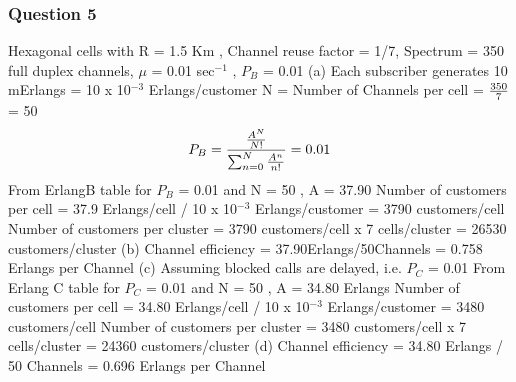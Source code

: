 \documentclass[12pt]{article}
\begin{document}
\subsubsection*{Question 5}
\vspace{5mm}
Hexagonal cells with R = 1.5 Km , 
Channel reuse factor = 1/7,
Spectrum = 350 full duplex channels,
\(\mu\) = 0.01 sec\(^{-1}\) , 
\(P_B\) = 0.01
\newline
\newline
(a) Each subscriber generates 10 mErlangs = 10 x 10\(^{-3}\) Erlangs/customer
\newline
\newline
N = Number of Channels per cell = \(350\over7\) = 50
\begin{equation*}
	P_B = { {{A^N}\over N!} \over {\sum_{n=0}^{N} { A^n \over n! } }  } = 0.01
\end{equation*}
From ErlangB table for \(P_B\) = 0.01 and N = 50 , A = 37.90
\newline
\newline
Number of customers per cell = {37.9 Erlangs/cell \bigg/ 10 x 10\(^{-3}\) Erlangs/customer}
= 3790 customers/cell
\newline
\newline
Number of customers per cluster = 3790 customers/cell x 7 cells/cluster 
= 26530 customers/cluster
\newline
\newline
(b) Channel efficiency 
\newline
= 37.90Erlangs/50Channels = 0.758 Erlangs per Channel
\newline
\newline
(c) Assuming blocked calls are delayed, i.e. \(P_C\) = 0.01
\newline
\newline
From Erlang C table for \(P_C\) = 0.01 and N = 50 , A = 34.80 Erlangs
\newline
Number of customers per cell = {34.80 Erlangs/cell \bigg/ 10 x 10\(^{-3}\) Erlangs/customer}
= 3480 customers/cell
\newline
\newline
Number of customers per cluster = 3480 customers/cell x 7 cells/cluster
= 24360 customers/cluster
\newline
\newline
(d) Channel efficiency
\newline
= 34.80 Erlangs / 50 Channels = 0.696 Erlangs per Channel
\newpage
\end{document}

